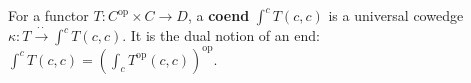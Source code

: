 For a functor $T: C^{\text{op}} \times C \rightarrow D$, a \textbf{coend} $\int^c T(c, c)$ is a universal cowedge $\kappa: T \xrightarrow{\cdot\cdot} \int^c T(c, c)$. It is the dual notion of an end: $\int^c T(c, c) = \left(\int_c T^{\text{op}}(c, c)\right)^{\text{op}}$.